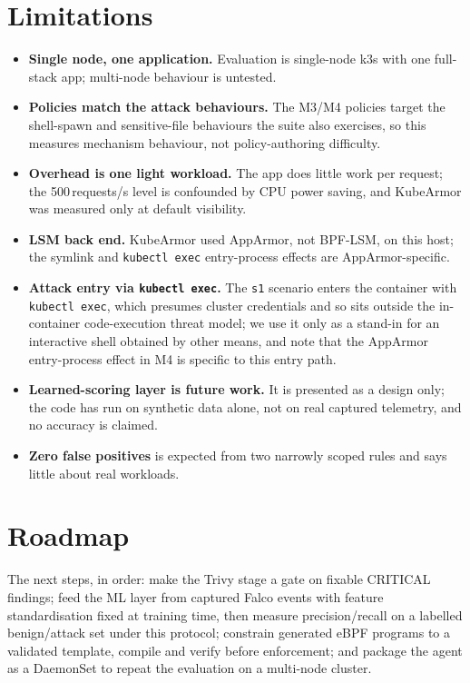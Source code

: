 \documentclass[10pt,conference]{IEEEtran}
\begin{document}
\section{Limitations}\label{sec:limits}
\begin{itemize}
\item \textbf{Single node, one application.} Evaluation is single-node k3s with one full-stack app; multi-node behaviour is untested.
\item \textbf{Policies match the attack behaviours.} The M3/M4 policies target the shell-spawn and sensitive-file behaviours the suite also exercises, so this measures mechanism behaviour, not policy-authoring difficulty.
\item \textbf{Overhead is one light workload.} The app does little work per request; the 500\,requests/s level is confounded by CPU power saving, and KubeArmor was measured only at default visibility.
\item \textbf{LSM back end.} KubeArmor used AppArmor, not BPF-LSM, on this host; the symlink and \texttt{kubectl exec} entry-process effects are AppArmor-specific.
\item \textbf{Attack entry via \texttt{kubectl exec}.} The \texttt{s1} scenario enters the container with \texttt{kubectl exec}, which presumes cluster credentials and so sits outside the in-container code-execution threat model; we use it only as a stand-in for an interactive shell obtained by other means, and note that the AppArmor entry-process effect in M4 is specific to this entry path.
\item \textbf{Learned-scoring layer is future work.} It is presented as a design only; the code has run on synthetic data alone, not on real captured telemetry, and no accuracy is claimed.
\item \textbf{Zero false positives} is expected from two narrowly scoped rules and says little about real workloads.
\end{itemize}

\section{Roadmap}\label{sec:road}
The next steps, in order: make the Trivy stage a gate on fixable CRITICAL findings; feed the ML layer from captured Falco events with feature standardisation fixed at training time, then measure precision/recall on a labelled benign/attack set under this protocol; constrain generated eBPF programs to a validated template, compile and verify before enforcement; and package the agent as a DaemonSet to repeat the evaluation on a multi-node cluster.
\end{document}
